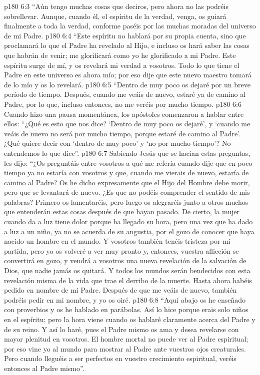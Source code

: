 \vs p180 6:3 “Aún tengo muchas cosas que deciros, pero ahora no las podréis sobrellevar. Aunque, cuando él, el espíritu de la verdad, venga, os guiará finalmente a toda la verdad, conforme paséis por las muchas moradas del universo de mi Padre.
\vs p180 6:4 “Este espíritu no hablará por su propia cuenta, sino que proclamará lo que el Padre ha revelado al Hijo, e incluso os hará saber las cosas que habrán de venir; me glorificará como yo he glorificado a mi Padre. Este espíritu surge de mí, y os revelará mi verdad a vosotros. Todo lo que tiene el Padre en este universo es ahora mío; por eso dije que este nuevo maestro tomará de lo mío y os lo revelará.
\vs p180 6:5 “Dentro de muy poco os dejaré por un breve período de tiempo. Después, cuando me veáis de nuevo, estaré ya de camino al Padre, por lo que, incluso entonces, no me veréis por mucho tiempo.
\vs p180 6:6 Cuando hizo una pausa momentánea, los apóstoles comenzaron a hablar entre ellos: “¿Qué es esto que nos dice? ‘Dentro de muy poco os dejaré’, y ‘cuando me veáis de nuevo no será por mucho tiempo, porque estaré de camino al Padre’. ¿Qué quiere decir con ‘dentro de muy poco’ y ‘no por mucho tiempo’? No entendemos lo que dice”.
\vs p180 6:7 Sabiendo Jesús que se hacían estas preguntas, les dijo: “¿Os preguntáis entre vosotros a qué me refería cuando dije que en poco tiempo ya no estaría con vosotros y que, cuando me vierais de nuevo, estaría de camino al Padre? Os he dicho expresamente que el Hijo del Hombre debe morir, pero que se levantará de nuevo. ¿Es que no podéis comprender el sentido de mis palabras? Primero os lamentaréis, pero luego os alegraréis junto a otros muchos que entenderán estas cosas después de que hayan pasado. De cierto, la mujer cuando da a luz tiene dolor porque ha llegado su hora, pero una vez que ha dado a luz a un niño, ya no se acuerda de su angustia, por el gozo de conocer que haya nacido un hombre en el mundo. Y vosotros también tenéis tristeza por mi partida, pero yo os volveré a ver muy pronto y, entonces, vuestra aflicción se convertirá en gozo, y vendrá a vosotros una nueva revelación de la salvación de Dios, que nadie jamás os quitará. Y todos los mundos serán bendecidos con esta revelación misma de la vida que trae el derribo de la muerte. Hasta ahora habéis pedido en nombre de mi Padre. Después de que me veáis de nuevo, también podréis pedir en mi nombre, y yo os oiré.
\vs p180 6:8 “Aquí abajo os he enseñado con proverbios y os he hablado en parábolas. Así lo hice porque erais solo niños en el espíritu; pero la hora viene cuando os hablaré claramente acerca del Padre y de su reino. Y así lo haré, pues el Padre mismo os ama y desea revelarse con mayor plenitud en vosotros. El hombre mortal no puede ver al Padre espiritual; por eso vine yo al mundo para mostrar al Padre ante vuestros ojos creaturales. Pero cuando lleguéis a ser perfectos en vuestro crecimiento espiritual, veréis entonces al Padre mismo”.
